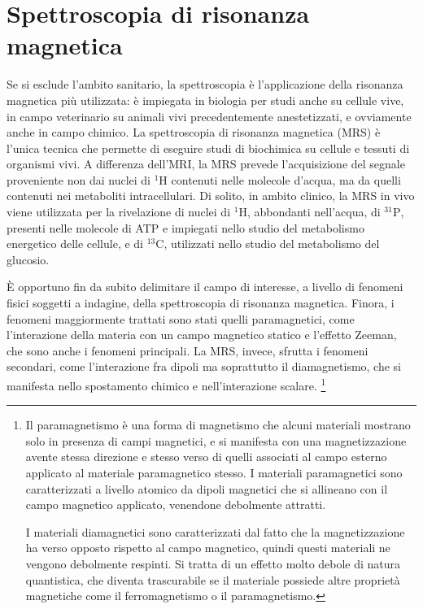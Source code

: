 \documentclass{report}
\numberwithin{equation}{section}
\numberwithin{figure}{section}
\begin{document}
\section{Spettroscopia di risonanza magnetica}
Se si esclude l'ambito sanitario, la spettroscopia è l'applicazione della risonanza magnetica più utilizzata: è impiegata in biologia per studi anche su cellule vive, in campo veterinario su animali vivi precedentemente anestetizzati, e ovviamente anche in campo chimico. La spettroscopia di risonanza magnetica (MRS) è l'unica tecnica che permette di eseguire studi di biochimica su cellule e tessuti di organismi vivi. A differenza dell'MRI, la MRS prevede l'acquisizione del segnale proveniente non dai nuclei di $\mathrm{^1H}$ contenuti nelle molecole d'acqua, ma da quelli contenuti nei metaboliti intracellulari. Di solito, in ambito clinico, la MRS in vivo viene utilizzata per la rivelazione di nuclei di $\mathrm{^1H}$, abbondanti nell'acqua, di $\mathrm{^{31}P}$, presenti nelle molecole di ATP e impiegati nello studio del metabolismo energetico delle cellule, e di $\mathrm{^{13}C}$, utilizzati nello studio del metabolismo del glucosio.

È opportuno fin da subito delimitare il campo di interesse, a livello di fenomeni fisici soggetti a indagine, della spettroscopia di risonanza magnetica. Finora, i fenomeni maggiormente trattati sono stati quelli paramagnetici, come l'interazione della materia con un campo magnetico statico e l'effetto Zeeman, che sono anche i fenomeni principali. La MRS, invece, sfrutta i fenomeni secondari, come l'interazione fra dipoli ma soprattutto il diamagnetismo, che si manifesta nello spostamento chimico e nell'interazione scalare.%
\footnote{Il paramagnetismo è una forma di magnetismo che alcuni materiali mostrano solo in presenza di campi magnetici, e si manifesta con una magnetizzazione avente stessa direzione e stesso verso di quelli associati al campo esterno applicato al materiale paramagnetico stesso. I materiali paramagnetici sono caratterizzati a livello atomico da dipoli magnetici che si allineano con il campo magnetico applicato, venendone debolmente attratti.

I materiali diamagnetici sono caratterizzati dal fatto che la magnetizzazione ha verso opposto rispetto al campo magnetico, quindi questi materiali ne vengono debolmente respinti. Si tratta di un effetto molto debole di natura quantistica, che diventa trascurabile se il materiale possiede altre proprietà magnetiche come il ferromagnetismo o il paramagnetismo.}
\end{document}

